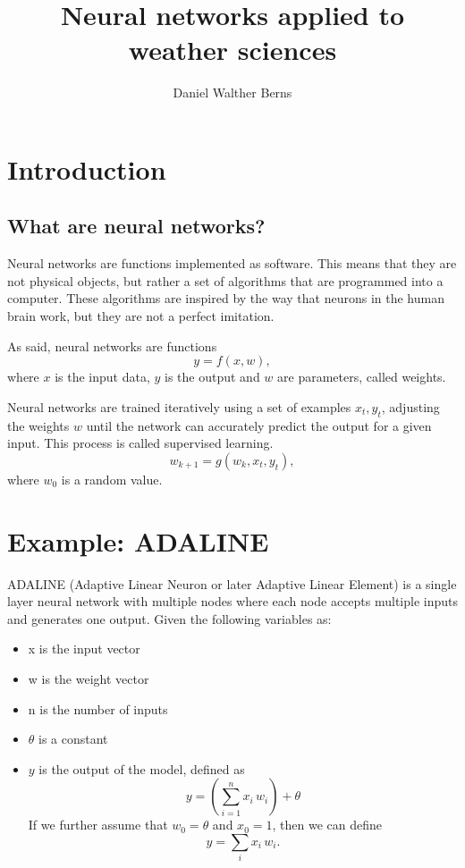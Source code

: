 \documentclass[10pt,a4paper]{article}
\author{Daniel Walther Berns}
\title{Neural networks applied to weather sciences}
\begin{document}
	\section{Introduction}
	\subsection{What are neural networks?}

Neural networks are functions implemented as software. This means that they are not physical objects, but rather a set of algorithms that are programmed into a computer. These algorithms are inspired by the way that neurons in the human brain work, but they are not a perfect imitation.

As said, neural networks are functions 
\begin{equation}
	y = f(x, w),
\end{equation}
where $x$ is the input data, $y$ is the output and $w$ are parameters, called weights.

Neural networks are trained iteratively using a set of examples $x_{t}, y_{t}$, adjusting the weights $w$ until the network can accurately predict the output for a given input. This process is called supervised learning.
\begin{equation}
	w_{k+1} = g(w_{k}, x_{t}, y_{t}), 
\end{equation}
where $w_{0}$ is a random value.

\section{Example: ADALINE}

ADALINE (Adaptive Linear Neuron or later Adaptive Linear Element) is a single layer neural network with multiple nodes where each node accepts multiple inputs and generates one output. Given the following variables as:

\begin{itemize}
\item x is the input vector
\item w is the weight vector
\item n is the number of inputs
\item $\theta$ is a constant
\item $y$ is the output of the model, defined as
\begin{equation}
	y = \left(\sum_{i=1}^{n} x_{i} \, w_{i} \right) + \theta
\end{equation}
If we further assume that $w_{0} = \theta$ and $x_{0} = 1$,
then we can define 
\begin{equation}
	y = \sum_{i} x_{i} \, w_{i}.
\end{equation}
\end{itemize}
\end{document}
